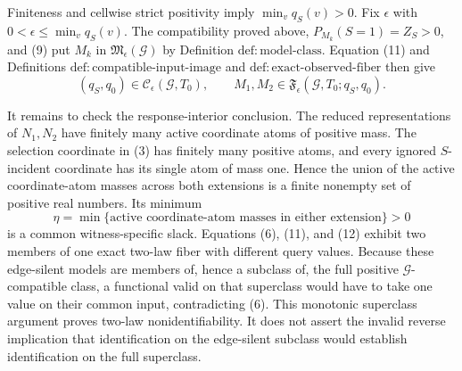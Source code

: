 Finiteness and cellwise strict positivity imply \(\min_vq_S(v)>0\). Fix \(\epsilon\) with \(0<\epsilon\leq\min_vq_S(v)\). The compatibility proved above, \(P_{M_k}(S=1)=Z_S>0\), and (9) put \(M_k\) in \(\mathfrak M_{\epsilon}(\mathcal G)\) by Definition \(\mathrm{def{:}model\text{-}class}\). Equation (11) and Definitions \(\mathrm{def{:}compatible\text{-}input\text{-}image}\) and \(\mathrm{def{:}exact\text{-}observed\text{-}fiber}\) then give
\[
 (q_S,q_0)\in\mathcal C_{\epsilon}(\mathcal G,T_0),
 \qquad
 M_1,M_2\in\mathfrak F_{\epsilon}(\mathcal G,T_0;q_S,q_0).
 \tag{12}
\]

It remains to check the response-interior conclusion. The reduced representations of \(N_1,N_2\) have finitely many active coordinate atoms of positive mass. The selection coordinate in (3) has finitely many positive atoms, and every ignored \(S\)-incident coordinate has its single atom of mass one. Hence the union of the active coordinate-atom masses across both extensions is a finite nonempty set of positive real numbers. Its minimum
\[
 \eta
 =\min\{\text{active coordinate-atom masses in either extension}\}
 >0
 \tag{13}
\]
is a common witness-specific slack. Equations (6), (11), and (12) exhibit two members of one exact two-law fiber with different query values. Because these edge-silent models are members of, hence a subclass of, the full positive \(\mathcal G\)-compatible class, a functional valid on that superclass would have to take one value on their common input, contradicting (6). This monotonic superclass argument proves two-law nonidentifiability. It does not assert the invalid reverse implication that identification on the edge-silent subclass would establish identification on the full superclass.